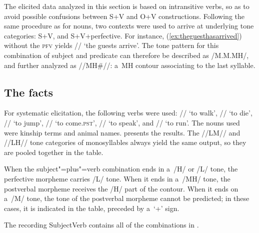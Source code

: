 The elicited data analyzed in this section is based on intransitive verbs, so as to avoid possible
confusions between S+V and O+V constructions. Following the same procedure as for
nouns, two contexts were used to arrive at underlying tone categories: S+V, and
S+V+{perfective}. For instance, (\ref{ex:theguesthasarrived}) without the \textsc{pfv} yields // ‘the guests arrive’. The tone pattern for this combination of subject and predicate can therefore be described as /M.M.MH/, and further analyzed as \mbox{//MH\#//}: a~MH contour associating to the last
syllable.


\subsection{The facts}
\label{sec:thefactssubjectandverb}

For systematic elicitation, the following verbs were used: // ‘to walk’, // ‘to die’, //
‘to jump’, // ‘to come.\textsc{pst}’, // ‘to speak’, and
// ‘to run’. The nouns used were kinship terms and animal names.  presents the
results. The \mbox{//LM//} and \mbox{//LH//} tone categories of monosyllables always yield the same output, so they are pooled
together in the table.

When the subject"=plus"=verb combination ends in a~/H/ or /L/ tone, the {perfective} morpheme carries
/L/ tone. When it ends in a~/MH/ tone, the postverbal morpheme receives the /H/ part of the contour. When it ends on
a~/M/ tone, the tone of the postverbal morpheme cannot be predicted; in these cases, it is indicated in the table, preceded by a~‘+’
sign.

The recording SubjectVerb contains all of the combinations in .


